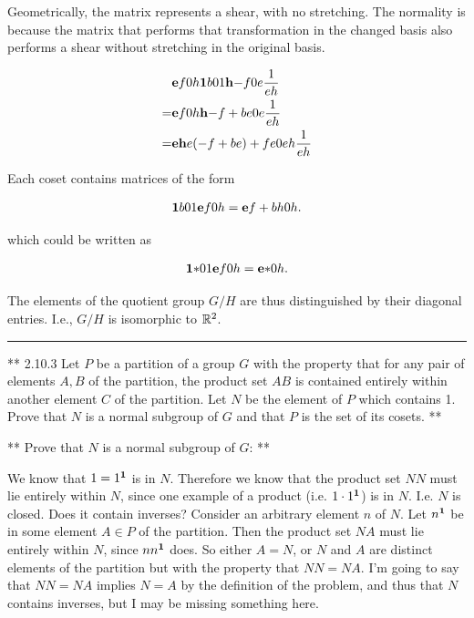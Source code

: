 Geometrically, the matrix represents a shear, with no stretching. The normality
is because the matrix that performs that transformation in the changed basis
also performs a shear without stretching in the original basis.


\begin{align*}
&\mathbf{e}{f}
     {0}{h} \mathbf{1}{b}
                {0}{1} \mathbf{h}{-f}
                           {0}{e} \frac{1}{eh} \\
= &\mathbf{e}{f}
       {0}{h} \mathbf{h}{-f + be}
                  {0}{e      } \frac{1}{eh} \\
= &\mathbf{eh}{e(-f + be) + fe}
       {0  }{eh             } \frac{1}{eh}
\end{align*}

Each coset contains matrices of the form

\begin{align*}
\mathbf{1}{b}
    {0}{1} \mathbf{e}{f}
               {0}{h} = \mathbf{e}{f + bh}
                            {0}{h     }.
\end{align*}

which could be written as

\begin{align*}
\mathbf{1}{*}
    {0}{1} \mathbf{e}{f}
               {0}{h} = \mathbf{e}{*}
                            {0}{h}.
\end{align*}

The elements of the quotient group $G/H$ are thus distinguished by their
diagonal entries. I.e., $G/H$ is isomorphic to $\mathbb{R}^2$.


\hrule

** 2.10.3 Let $P$ be a partition of a group $G$ with the property that for any
pair of elements $A, B$ of the partition, the product set $AB$ is contained
entirely within another element $C$ of the partition. Let $N$ be the element of
$P$ which contains 1. Prove that $N$ is a normal subgroup of $G$ and that $P$
is the set of its cosets. **

** Prove that $N$ is a normal subgroup of $G$: **

We know that $1 = 1^{\mathbf 1}$ is in $N$. Therefore we know that the product set $NN$
must lie entirely within $N$, since one example of a product
(i.e. $1\cdot1^{\mathbf 1}$) is in $N$. I.e. $N$ is closed. Does it contain inverses?
Consider an arbitrary element $n$ of $N$. Let $n^{\mathbf 1}$ be in some element $A \in
P$ of the partition. Then the product set $NA$ must lie entirely within $N$,
since $nn^{\mathbf 1}$ does. So either $A = N$, or $N$ and $A$ are distinct elements of
the partition but with the property that $NN = NA$. I'm going to say that $NN =
NA$ implies $N = A$ by the definition of the problem, and thus that $N$
contains inverses, but I may be missing something here.

